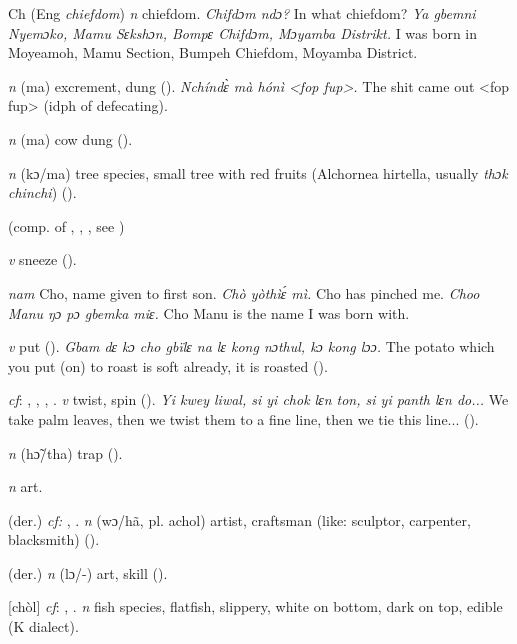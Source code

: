\begin{letter}{Ch}
 (Eng \textit{chiefdom}) \textit{n} chiefdom. \textit{Chifdɔm ndɔ?} In what chiefdom? \textit{Ya gbemni Nyemɔko, Mamu Sɛkshɔn, Bompɛ Chifdɔm, Mɔyamba Distrikt.} I was born in Moyeamoh, Mamu Section, Bumpeh Chiefdom, Moyamba District.

 \textit{n} (ma) excrement, dung (\citealt{Pichl1967}). \textit{Nchíndɛ̀ mà hónì <fop fup>.} The shit came out <fop fup> (idph of defecating).

 \textit{n} (ma) cow dung (\citealt{Pichl1967}). 

 \textit{n} (kɔ/ma) tree species, small tree with red fruits (Alchornea hirtella, usually \textit{thɔk chinchi}) (\citealt{Pichl1967}). 

 (comp. of , , , see )

 \textit{v} sneeze (\citealt{Pichl1967}).

 \textit{nam} Cho, name given to first son. \textit{Chò yòthìɛ́ mì.} Cho has pinched me. \textit{Choo Manu ŋɔ pɔ gbemka miɛ.} Cho Manu is the name I was born with.

 \textit{v} put (\citealt{Pichl1967}). \textit{Gbam dɛ kɔ cho gbïlɛ na lɛ kong nɔthul, kɔ kong lɔɔ.} The potato which you put (on) to roast is soft already, it is roasted (\citealt{Pichl1967}).

 \textit{cf}: , , , . \textit{v} twist, spin (\citealt{Pichl1967}). \textit{Yi kwey liwal, si yi chok lɛn ton, si yi panth lɛn do...} We take palm leaves, then we twist them to a fine line, then we tie this line... (\citealt{Pichl1967}). 

 \textit{n} (hɔ̃/tha) trap (\citealt{Pichl1967}). 

 \textit{n} art.

 (der.) \textit{cf:} , . \textit{n} (wɔ/hã, pl. achol) artist, craftsman (like: sculptor, carpenter, blacksmith) (\citealt{Pichl1967}).

 (der.) \textit{n} (lɔ/-) art, skill (\citealt{Pichl1967}).

 [chòl] \textit{cf}: , . \textit{n} fish species, flatfish, slippery, white on bottom, dark on top, edible (K dialect). 


\end{letter}
